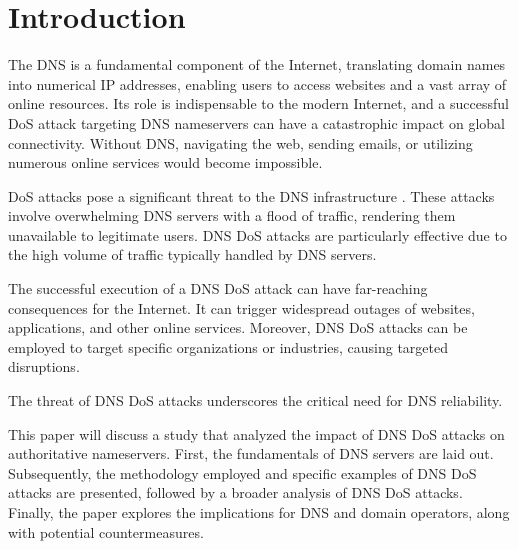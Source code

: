 \section{Introduction}
The \acf{DNS} is a fundamental component of the Internet, translating domain names into numerical IP addresses, enabling users to access websites and a vast array of online resources.
Its role is indispensable to the modern Internet, and a successful \ac{DoS} attack targeting \ac{DNS} nameservers can have a catastrophic impact on global connectivity.
Without \ac{DNS}, navigating the web, sending emails, or utilizing numerous online services would become impossible.

\ac{DoS} attacks pose a significant threat to the \ac{DNS} infrastructure \cite{dynanalysis} \cite{wireddyn}.
These attacks involve overwhelming \ac{DNS} servers with a flood of traffic, rendering them unavailable to legitimate users.
\ac{DNS} \ac{DoS} attacks are particularly effective due to the high volume of traffic typically handled by \ac{DNS} servers.

The successful execution of a \ac{DNS} \ac{DoS} attack can have far-reaching consequences for the Internet.
It can trigger widespread outages of websites, applications, and other online services.
Moreover, \ac{DNS} \ac{DoS} attacks can be employed to target specific organizations or industries, causing targeted disruptions.

The threat of \ac{DNS} \ac{DoS} attacks underscores the critical need for \ac{DNS} reliability.

This paper will discuss a study that analyzed the impact of DNS \ac{DoS} attacks on authoritative nameservers.
First, the fundamentals of \ac{DNS} servers are laid out.
Subsequently, the methodology employed and specific examples of \ac{DNS} \ac{DoS} attacks are presented, followed by a broader analysis of \ac{DNS} \ac{DoS} attacks.
Finally, the paper explores the implications for \ac{DNS} and domain operators, along with potential countermeasures.